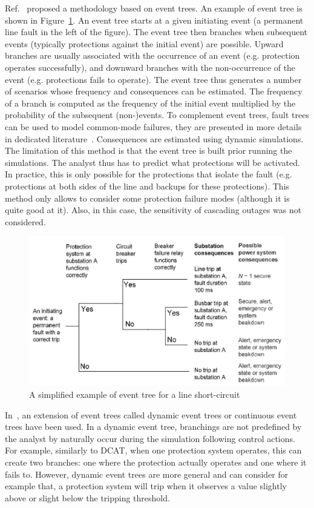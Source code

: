 Ref.~\cite{Haarla, GridPSA} proposed a methodology based on event trees. An example of event tree is shown in Figure~\ref{fig:eventTree}. An event tree starts at a given initiating event (a permanent line fault in the left of the figure). The event tree then branches when subsequent events (typically protections against the initial event) are possible. Upward branches are usually associated with the occurrence of an event (e.g. protection operates successfully), and downward branches with the non-occurrence of the event (e.g. protections fails to operate). The event tree thus generates a number of scenarios whose frequency and consequences can be estimated. The frequency of a branch is computed as the frequency of the initial event multiplied by the probability of the subsequent (non-)events. To complement event trees, fault trees can be used to model common-mode failures, they are presented in more details in dedicated literature~\cite{FaultTreeHandbook}. Consequences are estimated using dynamic simulations. The limitation of this method is that the event tree is built prior running the simulations. The analyst thus has to predict what protections will be activated. In practice, this is only possible for the protections that isolate the fault (e.g. protections at both sides of the line and backups for these protections). This method only allows to consider some protection failure modes (although it is quite good at it). Also, in this case, the sensitivity of cascading outages was not considered.

\begin{figure}
    \centering
    \includegraphics[width=0.8\linewidth]{Figs/EventTree.png}
    \caption{A simplified example of event tree for a line short-circuit~\cite{GridPSA}}
    \label{fig:eventTree}
\end{figure}

In~\cite{PierreIEEEtran, Faghihi}, an extension of event trees called dynamic event trees or continuous event trees have been used. In a dynamic event tree, branchings are not predefined by the analyst by naturally occur during the simulation following control actions. For example, similarly to DCAT, when one protection system operates, this can create two branches: one where the protection actually operates and one where it fails to. However, dynamic event trees are more general and can consider for example that, a protection system will trip when it observes a value slightly above or slight below the tripping threshold.

